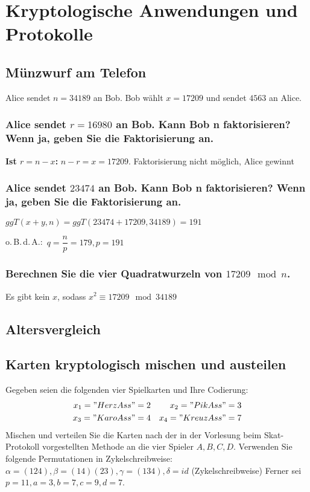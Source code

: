\section{Kryptologische Anwendungen und Protokolle}

\subsection{Münzwurf am Telefon}
Alice sendet $n = 34189$ an Bob. Bob wählt $x = 17209$ und sendet $4563$ an Alice.
\subsubsection{Alice sendet $r = 16980$ an Bob. Kann Bob n faktorisieren? Wenn ja, geben Sie die
Faktorisierung an.}

\textbf{Ist $r=n-x$:} $n-r=x = 17209$. Faktorisierung nicht möglich, Alice gewinnt

\subsubsection{Alice sendet $23474$ an Bob. Kann Bob n faktorisieren? Wenn ja, geben Sie die
Faktorisierung an.}

$ggT(x+y,n) = ggT(23474+17209, 34189) = 191$

o.\,B.\,d.\,A.:~$q = \dfrac{n}{p} = 179, p = 191$ 

\subsubsection{Berechnen Sie die vier Quadratwurzeln von $17209 \mod n$.}

Es gibt kein $x$, sodass $x^2 \equiv 17209 \mod 34189$


\subsection{Altersvergleich}



\subsection{Karten kryptologisch mischen und austeilen}
Gegeben seien die folgenden vier Spielkarten und Ihre Codierung:
\begin{align}
x_1="Herz Ass" &= 2  &     x_2="Pik Ass"  &= 3 \\
x_3="Karo Ass" &= 4  &     x_4="Kreuz Ass"&= 7
\end{align}
Mischen und verteilen Sie die Karten nach der in der Vorlesung beim Skat-Protokoll
vorgestellten Methode an die vier Spieler $A, B, C, D$.
Verwenden Sie folgende Permutationen in Zykelschreibweise:
$\alpha = (124), \beta = (14)(23), \gamma =(134), \delta=id$ (Zykelschreibweise)
Ferner sei $p=11, a=3, b=7, c=9, d=7$.


